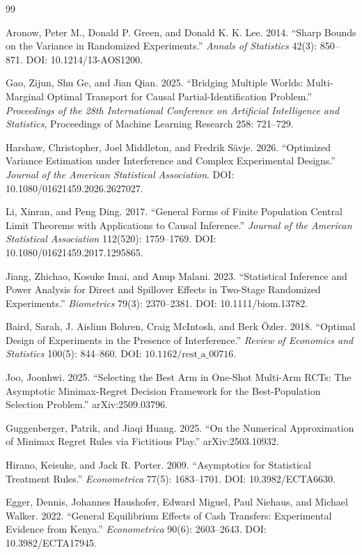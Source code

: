 \documentclass{article}
\begin{document}
\begin{thebibliography}{99}

   Aronow, Peter M., Donald P. Green, and Donald K. K. Lee. 2014. ``Sharp Bounds on the Variance in Randomized Experiments.'' \emph{Annals of Statistics} 42(3): 850--871. DOI: 10.1214/13-AOS1200.

   Gao, Zijun, Shu Ge, and Jian Qian. 2025. ``Bridging Multiple Worlds: Multi-Marginal Optimal Transport for Causal Partial-Identification Problem.'' \emph{Proceedings of the 28th International Conference on Artificial Intelligence and Statistics}, Proceedings of Machine Learning Research 258: 721--729.

   Harshaw, Christopher, Joel Middleton, and Fredrik Sävje. 2026. ``Optimized Variance Estimation under Interference and Complex Experimental Designs.'' \emph{Journal of the American Statistical Association}. DOI: 10.1080/01621459.2026.2627027.

   Li, Xinran, and Peng Ding. 2017. ``General Forms of Finite Population Central Limit Theorems with Applications to Causal Inference.'' \emph{Journal of the American Statistical Association} 112(520): 1759--1769. DOI: 10.1080/01621459.2017.1295865.

   Jiang, Zhichao, Kosuke Imai, and Anup Malani. 2023. ``Statistical Inference and Power Analysis for Direct and Spillover Effects in Two-Stage Randomized Experiments.'' \emph{Biometrics} 79(3): 2370--2381. DOI: 10.1111/biom.13782.

   Baird, Sarah, J. Aislinn Bohren, Craig McIntosh, and Berk Özler. 2018. ``Optimal Design of Experiments in the Presence of Interference.'' \emph{Review of Economics and Statistics} 100(5): 844--860. DOI: \(10.1162/\mathrm{rest\_a\_00716}\).

   Joo, Joonhwi. 2025. ``Selecting the Best Arm in One-Shot Multi-Arm RCTs: The Asymptotic Minimax-Regret Decision Framework for the Best-Population Selection Problem.'' arXiv:2509.03796.

   Guggenberger, Patrik, and Jiaqi Huang. 2025. ``On the Numerical Approximation of Minimax Regret Rules via Fictitious Play.'' arXiv:2503.10932.

   Hirano, Keisuke, and Jack R. Porter. 2009. ``Asymptotics for Statistical Treatment Rules.'' \emph{Econometrica} 77(5): 1683--1701. DOI: 10.3982/ECTA6630.

   Egger, Dennis, Johannes Haushofer, Edward Miguel, Paul Niehaus, and Michael Walker. 2022. ``General Equilibrium Effects of Cash Transfers: Experimental Evidence from Kenya.'' \emph{Econometrica} 90(6): 2603--2643. DOI: 10.3982/ECTA17945.

\end{thebibliography}
\end{document}
